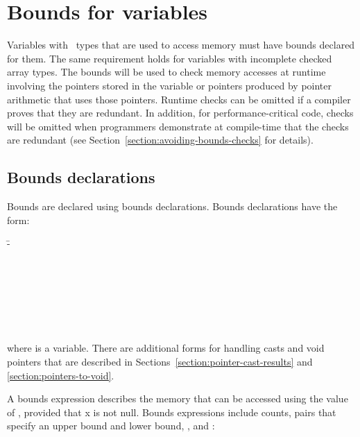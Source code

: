 
\chapter{Bounds for variables}
\label{chapter:tracking-bounds}

Variables with \arrayptr\ types that are used to access
memory must have bounds declared for them.  The same requirement
holds for variables with incomplete checked array types.
The bounds will be used to check
memory accesses at runtime involving the pointers stored in the variable
or pointers produced by pointer arithmetic that uses those pointers.
Runtime checks can be omitted if a compiler proves that they are
redundant. In addition, for performance-critical code, checks will be
omitted when programmers demonstrate at compile-time that the checks are
redundant (see Section~\ref{section:avoiding-bounds-checks} for details).

\section{Bounds declarations}
\label{section:bounds-declarations}

Bounds are declared using bounds declarations. Bounds declarations have
the form:

\begin{tabbing}
\=- \\
\>  \\
\\
 \\
\>  \\
\>  \\
\> \boundsunknown \\
\> \boundsany
\end{tabbing}

where  is a variable. There are additional forms for handling
casts and void pointers that are described in 
Sections~\ref{section:pointer-cast-results} and \ref{section:pointers-to-void}.

A bounds expression describes the memory that can be accessed using the
value of , provided that x is not null. Bounds expressions
include counts, pairs that specify an upper bound and lower bound,
\boundsunknown, and \boundsany:

